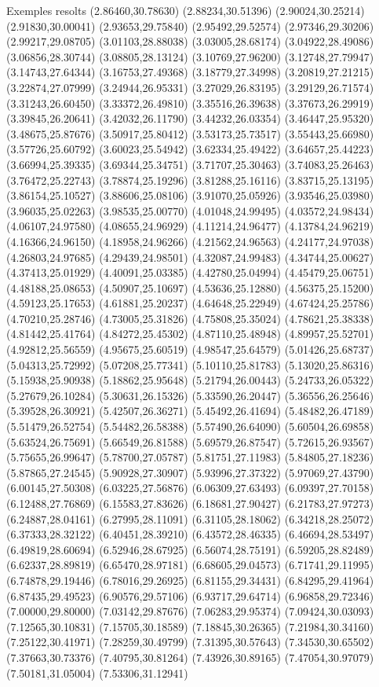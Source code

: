 \documentclass[11pt,a4paper]{article}
\begin{document}
\begin{fmex}{Exemples resolts}
(2.86460,30.78630) (2.88234,30.51396) (2.90024,30.25214) (2.91830,30.00041) (2.93653,29.75840) (2.95492,29.52574) (2.97346,29.30206) (2.99217,29.08705) (3.01103,28.88038) (3.03005,28.68174) (3.04922,28.49086) (3.06856,28.30744) (3.08805,28.13124) (3.10769,27.96200) (3.12748,27.79947) (3.14743,27.64344) (3.16753,27.49368) (3.18779,27.34998) (3.20819,27.21215) (3.22874,27.07999) (3.24944,26.95331) (3.27029,26.83195) (3.29129,26.71574) (3.31243,26.60450) (3.33372,26.49810) (3.35516,26.39638) (3.37673,26.29919) (3.39845,26.20641) (3.42032,26.11790) (3.44232,26.03354) (3.46447,25.95320) (3.48675,25.87676) (3.50917,25.80412) (3.53173,25.73517) (3.55443,25.66980) (3.57726,25.60792) (3.60023,25.54942) (3.62334,25.49422) (3.64657,25.44223) (3.66994,25.39335) (3.69344,25.34751) (3.71707,25.30463) (3.74083,25.26463) (3.76472,25.22743) (3.78874,25.19296) (3.81288,25.16116) (3.83715,25.13195) (3.86154,25.10527) (3.88606,25.08106) (3.91070,25.05926) (3.93546,25.03980) (3.96035,25.02263) (3.98535,25.00770) (4.01048,24.99495) (4.03572,24.98434) (4.06107,24.97580) (4.08655,24.96929) (4.11214,24.96477) (4.13784,24.96219) (4.16366,24.96150) (4.18958,24.96266) (4.21562,24.96563) (4.24177,24.97038) (4.26803,24.97685) (4.29439,24.98501) (4.32087,24.99483) (4.34744,25.00627) (4.37413,25.01929) (4.40091,25.03385) (4.42780,25.04994) (4.45479,25.06751) (4.48188,25.08653) (4.50907,25.10697) (4.53636,25.12880) (4.56375,25.15200) (4.59123,25.17653) (4.61881,25.20237) (4.64648,25.22949) (4.67424,25.25786) (4.70210,25.28746) (4.73005,25.31826) (4.75808,25.35024) (4.78621,25.38338) (4.81442,25.41764) (4.84272,25.45302) (4.87110,25.48948) (4.89957,25.52701) (4.92812,25.56559) (4.95675,25.60519) (4.98547,25.64579) (5.01426,25.68737) (5.04313,25.72992) (5.07208,25.77341) (5.10110,25.81783) (5.13020,25.86316) (5.15938,25.90938) (5.18862,25.95648) (5.21794,26.00443) (5.24733,26.05322) (5.27679,26.10284) (5.30631,26.15326) (5.33590,26.20447) (5.36556,26.25646) (5.39528,26.30921) (5.42507,26.36271) (5.45492,26.41694) (5.48482,26.47189) (5.51479,26.52754) (5.54482,26.58388) (5.57490,26.64090) (5.60504,26.69858) (5.63524,26.75691) (5.66549,26.81588) (5.69579,26.87547) (5.72615,26.93567) (5.75655,26.99647) (5.78700,27.05787) (5.81751,27.11983) (5.84805,27.18236) (5.87865,27.24545) (5.90928,27.30907) (5.93996,27.37322) (5.97069,27.43790) (6.00145,27.50308) (6.03225,27.56876) (6.06309,27.63493) (6.09397,27.70158) (6.12488,27.76869) (6.15583,27.83626) (6.18681,27.90427) (6.21783,27.97273) (6.24887,28.04161) (6.27995,28.11091) (6.31105,28.18062) (6.34218,28.25072) (6.37333,28.32122) (6.40451,28.39210) (6.43572,28.46335) (6.46694,28.53497) (6.49819,28.60694) (6.52946,28.67925) (6.56074,28.75191) (6.59205,28.82489) (6.62337,28.89819) (6.65470,28.97181) (6.68605,29.04573) (6.71741,29.11995) (6.74878,29.19446) (6.78016,29.26925) (6.81155,29.34431) (6.84295,29.41964) (6.87435,29.49523) (6.90576,29.57106) (6.93717,29.64714) (6.96858,29.72346) (7.00000,29.80000) (7.03142,29.87676) (7.06283,29.95374) (7.09424,30.03093) (7.12565,30.10831) (7.15705,30.18589) (7.18845,30.26365) (7.21984,30.34160) (7.25122,30.41971) (7.28259,30.49799) (7.31395,30.57643) (7.34530,30.65502) (7.37663,30.73376) (7.40795,30.81264) (7.43926,30.89165) (7.47054,30.97079) (7.50181,31.05004) (7.53306,31.12941) 
\end{fmex}
\end{document}
